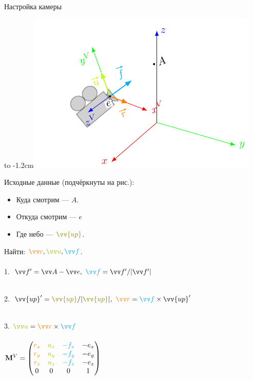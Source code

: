 \documentclass[10pt]{beamer}
\begin{document}
	\begin{frame} {Настройка камеры}
		
	{
		\hbox to -1.2cm{}\includegraphics[page=3]{camera.pdf}
	}
	{
		Исходные данные (подчёркнуты на рис.):
		\begin{itemize}
			\item Куда смотрим --- $A$.
			\item Откуда смотрим --- $e$
			\item Где небо --- ${\color{olive}\vv {up}}$.
		\end{itemize}
		Найти:  $	{\color{orange}\vv r},
		{\color{lime!80!black} \vv u} , 
		{\color{cyan} \vv f} $. \\ ~ \\
		
		
		1. $\vv f' = \vv A - \vv e,\ {\color{cyan} \vv f }= \vv f' / |\vv f'|$ \\ ~ \\ \pause
		
		2. $\vv{up}' = {\color{olive}\vv {up}} / |{\color{olive}\vv {up}}|, \ {\color{orange}\vv r} = {\color{cyan} \vv f }\times \vv {up}'$ \\ ~ \\ \pause
		
		3. ${\color{lime!80!black}\vv u} = {\color{orange}\vv r} \times {\color{cyan}\vv f}$ \\ ~ \\ 
		
		$\mathbf M^V = 
		\begin{pmatrix}
			{\color{orange}r_x} & {\color{lime!80!black}u_x} & {\color{cyan}-f_x}& -e_x \\
			{\color{orange}r_y} & {\color{lime!80!black}u_y} & {\color{cyan}-f_y}& -e_y \\
			{\color{orange}r_z} & {\color{lime!80!black}u_z} & {\color{cyan}-f_z}& -e_z \\
			0&0&0&1
		\end{pmatrix}$
		
	}
		
	\end{frame}
	
\end{document}
